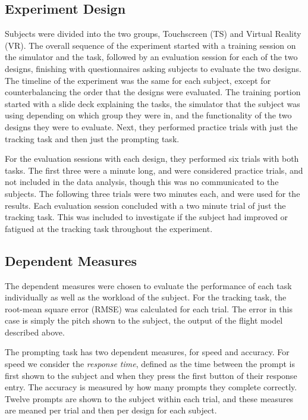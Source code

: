 \subsection{Experiment Design}

Subjects were divided into the two groups, Touchscreen (TS) and Virtual Reality (VR).
The overall sequence of the experiment started with a training session on the simulator and the task, followed by an evaluation session for each of the two designs, finishing with questionnaires asking subjects to evaluate the two designs.
The timeline of the experiment was the same for each subject, except for counterbalancing the order that the designs were evaluated.
The training portion started with a slide deck explaining the tasks, the simulator that the subject was using depending on which group they were in, and the functionality of the two designs they were to evaluate.
Next, they performed practice trials with just the tracking task and then just the prompting task.

For the evaluation sessions with each design, they performed six trials with both tasks.
The first three were a minute long, and were considered practice trials, and not included in the data analysis, though this was no communicated to the subjects.
The following three trials were two minutes each, and were used for the results.
Each evaluation session concluded with a two minute trial of just the tracking task.
This was included to investigate if the subject had improved or fatigued at the tracking task throughout the experiment.

\subsection{Dependent Measures}
\label{sec:de_dependent}

The dependent measures were chosen to evaluate the performance of each task individually as well as the workload of the subject.
For the tracking task, the root-mean square error (RMSE) was calculated for each trial.
The error in this case is simply the pitch shown to the subject, the output of the flight model described above.

The prompting task has two dependent measures, for speed and accuracy.
For speed we consider the \textit{response time}, defined as the time between the prompt is first shown to the subject and when they press the first button of their response entry.
The accuracy is measured by how many prompts they complete correctly.
Twelve prompts are shown to the subject within each trial, and these measures are meaned per trial and then per design for each subject.

